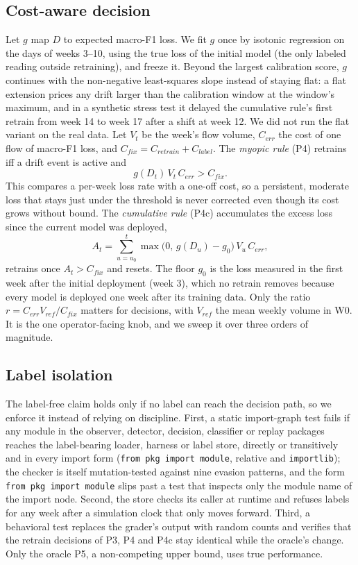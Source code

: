 \documentclass[conference]{IEEEtran}
\begin{document}
\subsection{Cost-aware decision}\label{sec:decision}
Let $g$ map $D$ to expected macro-F1 loss. We fit $g$ once by isotonic regression on the days of weeks 3--10, using the true loss of the initial model (the only labeled reading outside retraining), and freeze it. Beyond the largest calibration score, $g$ continues with the non-negative least-squares slope instead of staying flat: a flat extension prices any drift larger than the calibration window at the window's maximum, and in a synthetic stress test it delayed the cumulative rule's first retrain from week 14 to week 17 after a shift at week 12. We did not run the flat variant on the real data. Let $V_t$ be the week's flow volume, $C_{err}$ the cost of one flow of macro-F1 loss, and $C_{fix}=C_{retrain}+C_{label}$. The \emph{myopic rule} (P4) retrains iff a drift event is active and
\begin{equation}
g(D_t)\,V_t\,C_{err} > C_{fix}.
\end{equation}
This compares a per-week loss rate with a one-off cost, so a persistent, moderate loss that stays just under the threshold is never corrected even though its cost grows without bound. The \emph{cumulative rule} (P4c) accumulates the excess loss since the current model was deployed,
\begin{equation}
A_t=\sum_{u=u_0}^{t}\max\bigl(0,\,g(D_u)-g_0\bigr)\,V_u\,C_{err},
\end{equation}
retrains once $A_t>C_{fix}$ and resets. The floor $g_0$ is the loss measured in the first week after the initial deployment (week 3), which no retrain removes because every model is deployed one week after its training data. Only the ratio $r=C_{err}V_{ref}/C_{fix}$ matters for decisions, with $V_{ref}$ the mean weekly volume in W0. It is the one operator-facing knob, and we sweep it over three orders of magnitude.

\subsection{Label isolation}\label{sec:isolation}
The label-free claim holds only if no label can reach the decision path, so we enforce it instead of relying on discipline. First, a static import-graph test fails if any module in the observer, detector, decision, classifier or replay packages reaches the label-bearing loader, harness or label store, directly or transitively and in every import form (\texttt{from pkg import module}, relative and \texttt{importlib}); the checker is itself mutation-tested against nine evasion patterns, and the form \texttt{from pkg import module} slips past a test that inspects only the module name of the import node. Second, the store checks its caller at runtime and refuses labels for any week after a simulation clock that only moves forward. Third, a behavioral test replaces the grader's output with random counts and verifies that the retrain decisions of P3, P4 and P4c stay identical while the oracle's change. Only the oracle P5, a non-competing upper bound, uses true performance.
\end{document}
